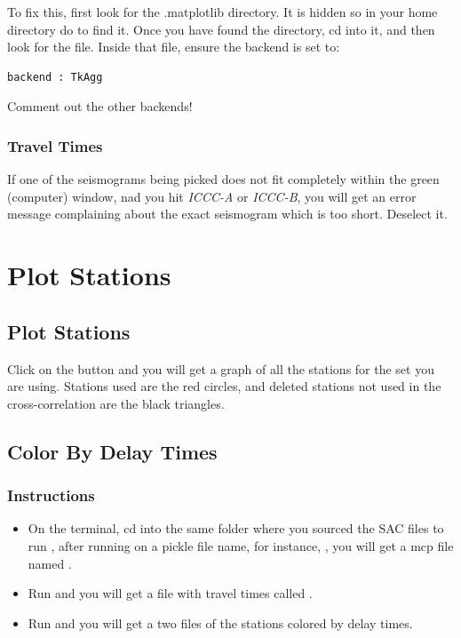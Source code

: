 \documentclass[letterpaper,10pt,english]{sphinxmanual}
\begin{document}
To fix this, first look for the .matplotlib directory. It is hidden so in your home directory do  to find it.
Once you have found the  directory, cd into it, and then look for the  file.
Inside that file, ensure the backend is set to:

\begin{Verbatim}[commandchars=\\\{\}]
backend : TkAgg
\end{Verbatim}

Comment out the other backends!


\subsection{Travel Times}
\label{docfiles/PickingTravelTimes:travel-times}
If one of the seismograms being picked does not fit completely within the green (computer) window, nad you hit \emph{ICCC-A} or \emph{ICCC-B}, you will get an error message complaining about the exact seismogram which is too short. Deselect it.


\chapter{Plot Stations}
\label{docfiles/PlotStations:plot-stations}\label{docfiles/PlotStations::doc}

\section{Plot Stations}
\label{docfiles/PlotStations:id1}
Click on the  button and you will get a graph of all the stations for the set you are using. Stations used are the red circles, and deleted stations not used in the cross-correlation are the black triangles.


\section{Color By Delay Times}
\label{docfiles/PlotStations:color-by-delay-times}

\subsection{Instructions}
\label{docfiles/PlotStations:instructions}\begin{itemize}
\item {} 
On the terminal, cd into the same folder where you sourced the SAC files to run , after running  on a pickle file name, for instance, , you will get a mcp file named .

\item {} 
Run  and you will get a file with travel times called .

\item {} 
Run  and you will get a two  files of the stations colored by delay times.

\end{itemize}
\end{document}
